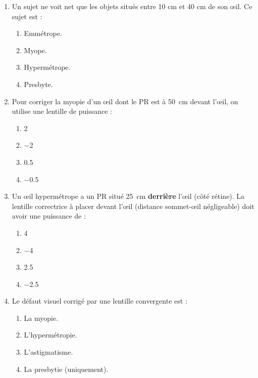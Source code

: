 \documentclass[11pt]{article}
\begin{document}
\begin{exercice}
\begin{enumerate}
    \item Un sujet ne voit net que les objets situés entre 10 cm et 40 cm de son œil. Ce sujet est :
    \begin{enumerate}
        \item Emmétrope.
        \item Myope.
        \item Hypermétrope.
        \item Presbyte.
    \end{enumerate}
    \item Pour corriger la myopie d'un œil dont le PR est à \SI{50}{\centi\metre} devant l'œil, on utilise une lentille de puissance :
    \begin{enumerate}
        \item \SI{+2}{\dioptre}
        \item \SI{-2}{\dioptre}
        \item \SI{+0,5}{\dioptre}
        \item \SI{-0,5}{\dioptre}
    \end{enumerate}
    \item Un œil hypermétrope a un PR situé \SI{25}{\centi\metre} \textbf{derrière} l'œil (côté rétine). La lentille correctrice à placer devant l'œil (distance sommet-œil négligeable) doit avoir une puissance de :
    \begin{enumerate}
        \item \SI{+4}{\dioptre}
        \item \SI{-4}{\dioptre}
        \item \SI{+2,5}{\dioptre}
        \item \SI{-2,5}{\dioptre}
    \end{enumerate}
    \item Le défaut visuel corrigé par une lentille convergente est :
    \begin{enumerate}
        \item La myopie.
        \item L'hypermétropie.
        \item L'astigmatisme.
        \item La presbytie (uniquement).
    \end{enumerate}
\end{enumerate}
\end{exercice}
\end{document}
